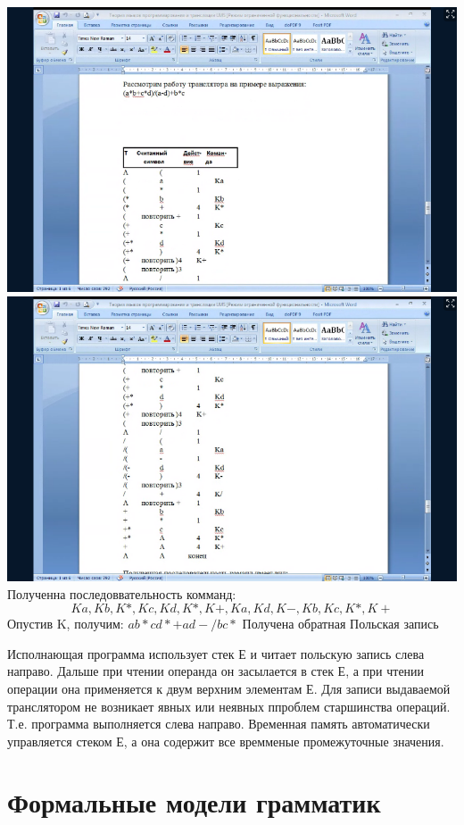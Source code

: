 \documentclass{article}
\begin{document}
    \includegraphics[scale=0.5]{5.png}
    \includegraphics[scale=0.5]{6.png}
    Полученна последоввательность комманд:
    $$
       Ka, Kb, K*, Kc, Kd, K*, K+, Ka, Kd, K-, Kb, Kc, K*, K+
    $$
    Опустив K, получим: $ab*cd*+ad-/bc*$
    Получена обратная Польская запись

    Исполнающая программа использует стек Е и читает польскую запись слева направо.
    Дальше при чтении операнда он засылается в стек Е, а при чтении операции она применяется к двум верхним элементам Е.
    Для записи выдаваемой транслятором не возникает явных или неявных ппроблем старшинства операций.
    Т.е. программа выполняется слева направо.
    Временная память автоматически управляется стеком Е, а она содержит все времменые промежуточные значения.
\newpage
    \section{Формальные модели грамматик}
\end{document}
